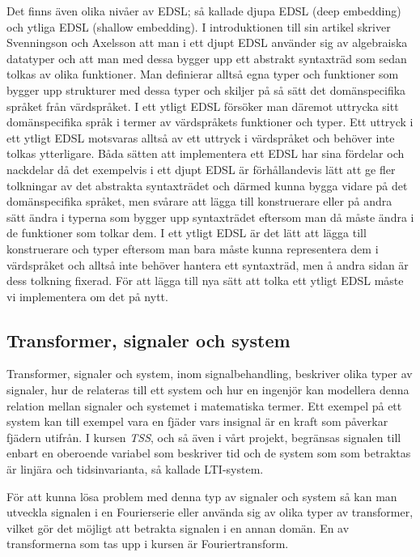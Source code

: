 \documentclass[]{article}
\begin{document}
Det finns även olika nivåer av EDSL; så kallade djupa EDSL (deep
embedding) och ytliga EDSL (shallow embedding). I introduktionen till
sin artikel skriver Svenningson och Axelsson \cite{Svenningsson2013}
att man i ett djupt EDSL använder sig av algebraiska datatyper och att
man med dessa bygger upp ett abstrakt syntaxträd som sedan tolkas av
olika funktioner. Man definierar alltså egna typer och funktioner som
bygger upp strukturer med dessa typer och skiljer på så sätt det
domänspecifika språket från värdspråket. I ett ytligt EDSL försöker
man däremot uttrycka sitt domänspecifika språk i termer av
värdspråkets funktioner och typer. Ett uttryck i ett ytligt EDSL
motsvaras alltså av ett uttryck i värdspråket och behöver inte tolkas
ytterligare. Båda sätten att implementera ett EDSL har sina fördelar
och nackdelar då det exempelvis i ett djupt EDSL är förhållandevis
lätt att ge fler tolkningar av det abstrakta syntaxträdet och därmed
kunna bygga vidare på det domänspecifika språket, men svårare att
lägga till konstruerare eller på andra sätt ändra i typerna som bygger
upp syntaxträdet eftersom man då måste ändra i de funktioner som
tolkar dem. I ett ytligt EDSL är det lätt att lägga till konstruerare
och typer eftersom man bara måste kunna representera dem i värdspråket
och alltså inte behöver hantera ett syntaxträd, men å andra sidan är
dess tolkning fixerad. För att lägga till nya sätt att tolka ett
ytligt EDSL måste vi implementera om det på nytt.

\subsection{Transformer, signaler och system}
Transformer, signaler och system, inom signalbehandling, beskriver
olika typer av signaler, hur de relateras till ett system och hur en
ingenjör kan modellera denna relation mellan signaler och systemet i
matematiska termer. Ett exempel på ett system kan till exempel vara en
fjäder vars insignal är en kraft som påverkar fjädern utifrån. I
kursen \textit{TSS}, och så även i vårt projekt, begränsas signalen
till enbart en oberoende variabel som beskriver tid och de system som
som betraktas är linjära och tidsinvarianta, så kallade LTI-system.

För att kunna lösa problem med denna typ av signaler och system så kan
man utveckla signalen i en Fourierserie eller använda sig av olika
typer av transformer, vilket gör det möjligt att betrakta signalen i
en annan domän. %
En av transformerna som tas upp i kursen är Fouriertransform.
\end{document}
